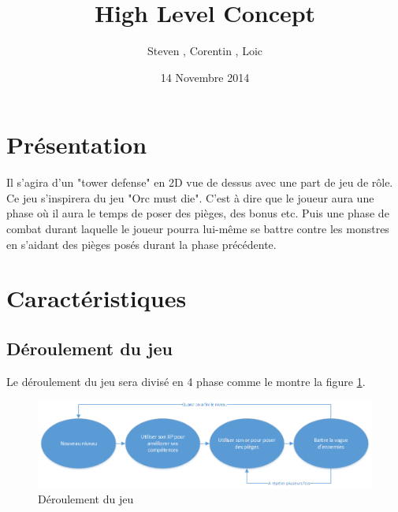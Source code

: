 \documentclass[12pt]{article}
\title{High Level Concept}
\author{Steven \bsc{Gerard}, Corentin \bsc{Raoult}, Loic \bsc{Tessier}}
\date {14 Novembre 2014}
\begin{document}
\maketitle{}

\section{Présentation}
Il s’agira d’un "tower defense" en 2D vue de dessus avec une part de jeu de rôle. Ce jeu
s'inspirera du jeu "Orc must die". C'est à dire que le joueur aura une phase où il aura le temps
de poser des pièges, des bonus etc. Puis une phase de combat durant laquelle le joueur pourra
lui-même se battre contre les monstres en s'aidant des pièges posés durant la phase précédente.

\section{Caractéristiques}
\subsection{Déroulement du jeu}
Le déroulement du jeu sera divisé en 4 phase comme le montre la figure \ref{Deroulement du jeu}.
\begin{figure}[h]
\begin{center}
\includegraphics[scale=0.7]{deroulementDuJeu.png} 
\end{center}
\caption{Déroulement du jeu}
\label{Deroulement du jeu}
\end{figure}
\end{document}
